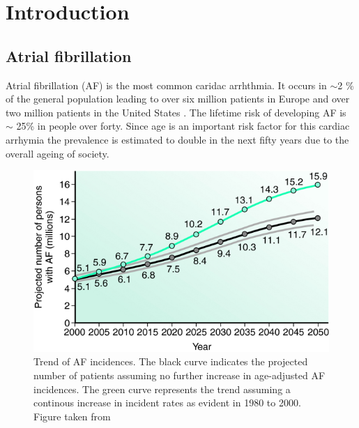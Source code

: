 \documentclass[type=dr, dr=rernat, accentcolor=tud7b,colorbacktitle, bigchapter, openright, twoside, 12pt ]{tudthesis}
\begin{document}
\author{MSc Anna Maria Constantinescu}
\date{\today}
\dateofexam{}{}
\makethesistitle



\tableofcontents

\chapter{Introduction}


\newpage

\section{Atrial fibrillation}

Atrial fibrillation (AF) is the most common caridac arrhthmia. It occurs in $\sim$2 \% of the general population leading to over six million patients in Europe \cite{ESC10} and over two million patients in the United States \cite{CE09}. The lifetime risk of developing AF is $\sim$ 25\% in people over forty. Since age is an important risk factor for this cardiac arrhymia the prevalence is estimated to double in the next fifty years due to the overall ageing of society.\newline

\begin{figure}[H]
\begin{center}
\includegraphics[scale=3]{af_incidences_us.png}
\caption{Trend of AF incidences. The black curve indicates the projected number of patients assuming no further increase in age-adjusted AF incidences. The green curve represents the trend assuming a continous increase in incident rates as evident in 1980 to 2000. Figure taken from \cite{Miy06}}
\label{USincidences}
\end{center}
\end{figure}
\end{document}
